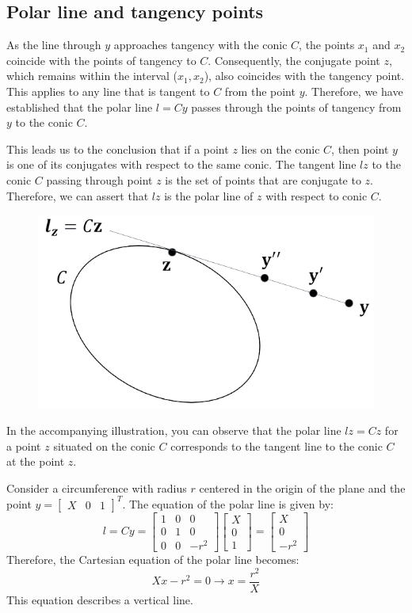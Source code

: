 \subsection*{Polar line and tangency points}
As the line through $y$ approaches tangency with the conic $C$, the points $x_1$ and $x_2$ coincide with the points of tangency to $C$. 
Consequently, the conjugate point $z$, which remains within the interval ($x_1,x_2$), also coincides with the tangency point. 
This applies to any line that is tangent to $C$ from the point $y$.
Therefore, we have established that the polar line $l=Cy$ passes through the points of tangency from $y$ to the conic $C$. 

This leads us to the conclusion that if a point $z$ lies on the conic $C$, then point $y$ is one of its conjugates with respect to the same conic. 
The tangent line $lz$ to the conic $C$ passing through point $z$ is the set of points that are conjugate to $z$. 
Therefore, we can assert that $lz$ is the polar line of $z$ with respect to conic $C$.
\begin{figure}[H]
    \centering
    \includegraphics[width=0.4\linewidth]{images/tangentpolar.png}
\end{figure}
In the accompanying illustration, you can observe that the polar line $lz = Cz$ for a point $z$ situated on the conic $C$ corresponds to the tangent line to the conic $C$ at the point $z$.
\begin{example}
    Consider a circumference with radius $r$ centered in the origin of the plane and the point $y={\begin{bmatrix} X & 0 & 1 \end{bmatrix}}^T$. 
    The equation of the polar line is given by:
    \[
    l=Cy=
    \begin{bmatrix}
        1 & 0 & 0 \\
        0 & 1 & 0 \\
        0 & 0 & -r^2
    \end{bmatrix}    
    \begin{bmatrix}
        X \\
        0 \\
        1 
    \end{bmatrix}    
    = 
    \begin{bmatrix}
        X \\
        0 \\
        -r^2 
    \end{bmatrix}  
    \]
    Therefore, the Cartesian equation of the polar line becomes: 
    \[X x-r^2 = 0 \rightarrow x=\dfrac{r^2}{X}\]
    This equation describes a vertical line.
\end{example}

